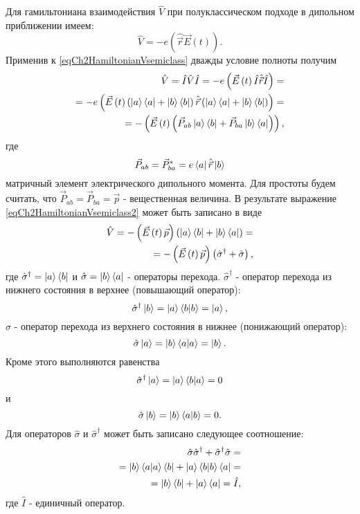 Для гамильтониана взаимодействия $\hat{V}$ при полуклассическом
подходе в дипольном приближении имеем:
\begin{equation}
\hat{V} = - e \left(\hat{\vec{r}} \vec{E}\left(t\right)\right).
\label{eqCh2HamiltonianVsemiclass}
\end{equation}
Применив к \eqref{eqCh2HamiltonianVsemiclass} дважды условие
полноты получим
\begin{eqnarray}
\hat{V} = \hat{I}\hat{V}\hat{I} = - e \left(\vec{E}\left(t\right)
\hat{I}\hat{\vec{r}}\hat{I}\right) = 
\nonumber \\
= - e \left(\vec{E}\left(t\right) 
\left(\ket{a}\bra{a} +
  \ket{b}\bra{b}\right)\hat{\vec{r}}
\left(\ket{a}\bra{a} +
  \ket{b}\bra{b}\right)\right) = 
\nonumber \\
= - \left(\vec{E}\left(t\right)
  \left(\vec{P}_{ab}\ket{a}\bra{b} +
    \vec{P}_{ba}\ket{b}\bra{a}\right)\right),
\label{eqCh2HamiltonianVsemiclass2}
\end{eqnarray}
где 
\[
\vec{P}_{ab} = \vec{P}_{ba}^{*} = e \bra{a}\hat{\vec{r}}\ket{b}
\]
матричный элемент электрического дипольного момента. 
Для простоты будем считать, что $\vec{P}_{ab} = \vec{P}_{ba} =
\vec{p}$ - вещественная величина. В результате выражение
\eqref{eqCh2HamiltonianVsemiclass2} может быть записано в виде
\begin{eqnarray}
\hat{V} 
= - \left(\vec{E}\left(t\right)\vec{p}\right)
\left(
  \ket{a}\bra{b} +
  \ket{b}\bra{a}\right) = 
\nonumber \\
= - \left(\vec{E}\left(t\right)\vec{p}\right) \left(\hat{\sigma}^{\dag} + \hat{\sigma}\right),
\label{eqCh2HamiltonianVsemiclass3}
\end{eqnarray}
где  $\hat{\sigma}^{\dag} = \ket{a}\bra{b}$ и 
$\hat{\sigma} = \ket{b}\bra{a}$ 
-  операторы перехода. 
$\hat{\sigma}^{\dag}$ -  оператор перехода из нижнего состояния в верхнее (повышающий
оператор):
\[
\hat{\sigma}^{\dag} \ket{b} = 
\ket{a}\bra{b}\ket{b} = 
\ket{a},
\]
$\hat{\sigma}$
- оператор перехода из верхнего состояния в нижнее
(понижающий оператор):
\[
\hat{\sigma}
\ket{a} = 
\ket{b}\bra{a}\ket{a} = 
\ket{b}.
\]
Кроме этого выполняются равенства
\[
\hat{\sigma}^{\dag} \ket{a} = 
\ket{a}\bra{b}\ket{a} = 
0
\]
и
\[
\hat{\sigma}
\ket{b} = 
\ket{b}\bra{a}\ket{b} = 
0.
\]
Для операторов $\hat{\sigma}$ и $\hat{\sigma}^{\dag}$ может быть записано
следующее соотношение: 
\begin{eqnarray}
\hat{\sigma}\hat{\sigma}^{\dag} + \hat{\sigma}^{\dag}\hat{\sigma} =
\nonumber \\
= \ket{b}\bra{a}\ket{a}\bra{b} + 
 \ket{a}\bra{b}\ket{b}\bra{a} = 
\nonumber \\
= \ket{b}\bra{b} + \ket{a}\bra{a} = \hat{I}, 
\label{eqCh2_task1}
\end{eqnarray}
где $\hat{I}$ - единичный оператор.


